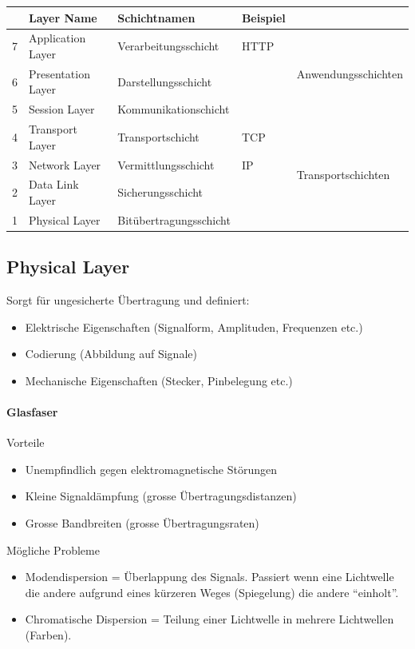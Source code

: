 \begin{tabular}{|c|l|l|l|l|}
\cline{2-4} 
\multicolumn{1}{c|}{} & Layer Name & Schichtnamen & Beispiel & \multicolumn{1}{l}{}\tabularnewline
\hline 
7 & Application Layer & Verarbeitungsschicht & HTTP & \multirow{3}{*}{Anwendungsschichten}\tabularnewline
\cline{1-4} 
6 & Presentation Layer & Darstellungsschicht &  & \tabularnewline
\cline{1-4} 
5 & Session Layer & Kommunikationschicht &  & \tabularnewline
\hline 
4 & Transport Layer & Transportschicht & TCP & \multirow{4}{*}{Transportschichten}\tabularnewline
\cline{1-4} 
3 & Network Layer & Vermittlungsschicht & IP & \tabularnewline
\cline{1-4} 
2 & Data Link Layer & Sicherungsschicht &  & \tabularnewline
\cline{1-4} 
1 & Physical Layer & Bitübertragungsschicht &  & \tabularnewline
\hline 
\end{tabular}


\subsection*{Physical Layer}

Sorgt für ungesicherte Übertragung und definiert:
\begin{itemize}
\item Elektrische Eigenschaften (Signalform, Amplituden, Frequenzen etc.)
\item Codierung (Abbildung auf Signale)
\item Mechanische Eigenschaften (Stecker, Pinbelegung etc.)
\end{itemize}

\paragraph*{Glasfaser}

Vorteile
\begin{itemize}
\item Unempfindlich gegen elektromagnetische Störungen
\item Kleine Signaldämpfung (grosse Übertragungsdistanzen)
\item Grosse Bandbreiten (grosse Übertragungsraten)
\end{itemize}
Mögliche Probleme
\begin{itemize}
\item Modendispersion = Überlappung des Signals. Passiert wenn eine Lichtwelle
die andere aufgrund eines kürzeren Weges (Spiegelung) die andere ``einholt''.
\item Chromatische Dispersion = Teilung einer Lichtwelle in mehrere Lichtwellen
(Farben).
\end{itemize}

